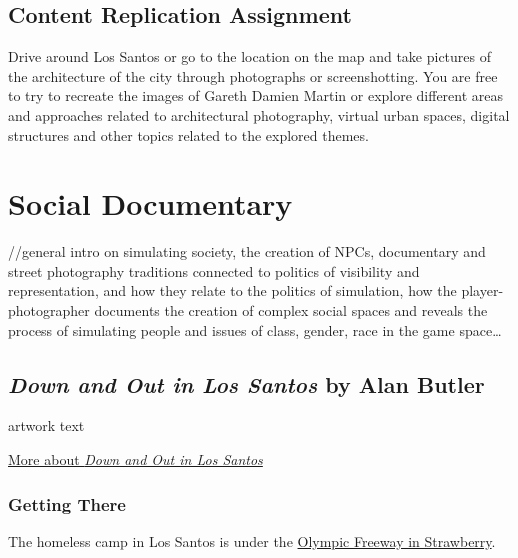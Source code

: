 \documentclass[
  openany]{book}
\begin{document}
\hypertarget{content-replication-assignment}{%
\section*{Content Replication Assignment}\label{content-replication-assignment}}

Drive around Los Santos or go to the location on the map and take pictures of the architecture of the city through photographs or screenshotting. You are free to try to recreate the images of Gareth Damien Martin or explore different areas and approaches related to architectural photography, virtual urban spaces, digital structures and other topics related to the explored themes.

\hypertarget{social-documentary}{%
\chapter{Social Documentary}\label{social-documentary}}

//general intro on simulating society, the creation of NPCs, documentary and street photography traditions connected to politics of visibility and representation, and how they relate to the politics of simulation, how the player-photographer documents the creation of complex social spaces and reveals the process of simulating people and issues of class, gender, race in the game space\ldots{}

\hypertarget{down-and-out-in-los-santos-by-alan-butler}{%
\section*{\texorpdfstring{\emph{Down and Out in Los Santos} by Alan Butler}{Down and Out in Los Santos by Alan Butler}}\label{down-and-out-in-los-santos-by-alan-butler}}

artwork text

\href{http://www.alanbutler.info/down-and-out-in-los-santos-2016}{More about \emph{Down and Out in Los Santos}}

\hypertarget{getting-there-1}{%
\subsection*{Getting There}\label{getting-there-1}}

The homeless camp in Los Santos is under the \href{https://grandtheftdata.com/landmarks/\#252.086,-1208.975,5,hybrid,name,Strawberry_Subway_Station,_Downtown}{Olympic Freeway in Strawberry}.
\end{document}
